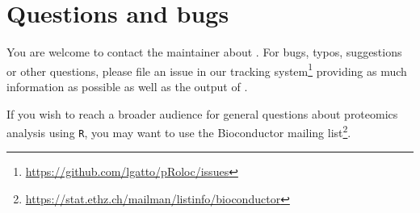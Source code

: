 \section*{Questions and bugs}

You are welcome to contact the maintainer about
. For bugs, typos, suggestions or other questions,
please file an issue in our tracking
system\footnote{\url{https://github.com/lgatto/pRoloc/issues}}
providing as much information as possible as well as the output of
.

If you wish to reach a broader audience for general questions about
proteomics analysis using \texttt{R}, you may want to use the
Bioconductor mailing
list\footnote{\url{https://stat.ethz.ch/mailman/listinfo/bioconductor}}.
